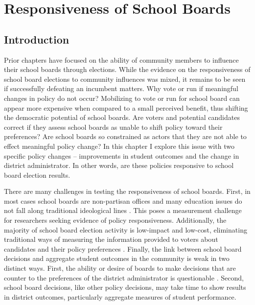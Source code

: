 \chapter{Responsiveness of School Boards}
\label{chap:policy}



\section{Introduction}

Prior chapters have focused on the ability of community members to influence 
their school boards through elections. While the evidence on the responsiveness 
of school board elections to community influences was mixed, it remains to 
be seen if successfully defeating an incumbent matters. Why vote or 
run if meaningful changes in policy do not occur? Mobilizing to vote or run for 
school board can appear more expensive when compared to a small perceived 
benefit, thus shifting the democratic potential of school boards. Are voters and 
potential candidates correct if they assess school boards as unable to shift 
policy toward their preferences? Are school boards so constrained as actors that 
they are not able to effect meaningful policy change? In this chapter I explore 
this issue with two specific policy changes -- improvements in student outcomes and 
the change in district administrator. In other words, are these policies responsive 
to school board election results. 

There are many challenges in testing the responsiveness of school boards. First, 
in most 
cases school boards are non-partisan offices and many education issues do not fall 
along traditional ideological lines \citep[for counter example:][]{RefWorks:347}. 
This poses a measurement challenge for researchers seeking evidence of policy 
responsiveness. Additionally, the majority of school board election activity is 
low-impact and low-cost, eliminating traditional ways of measuring the information 
provided to voters about candidates and their policy preferences 
\citep{RefWorks:322,RefWorks:321}. Finally, the link between school board decisions 
and aggregate student outcomes in the community is weak in two distinct ways. First, 
the ability or desire of boards to make decisions that are counter to the preferences 
of the district administrator is questionable \citep{RefWorks:258}. Second, 
school board decisions, like other policy decisions, may take time to 
show results in district outcomes, particularly aggregate measures of student 
performance. 

